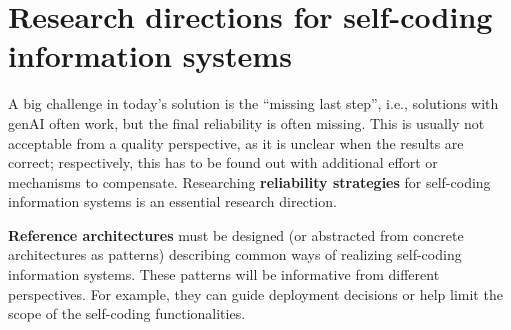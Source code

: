 \documentclass[sigconf]{acmart}
\newcommand{\inlinetodo}[1]{\todo[inline]{#1}}
\theoremstyle{definition}
\begin{document}


\section{Research directions for self-coding information systems}


A big challenge in today's solution is the ``missing last step'', i.e., solutions with genAI often work, but the final reliability is often missing. This is usually not acceptable from a quality perspective, as it is unclear when the results are correct; respectively, this has to be found out with additional effort or mechanisms to compensate. Researching \textbf{reliability strategies} for self-coding information systems is an essential research direction.

\textbf{Reference architectures} must be designed (or abstracted from concrete architectures as patterns) describing common ways of realizing self-coding information systems. These patterns will be informative from different perspectives. For example, they can guide deployment decisions or help limit the scope of the self-coding functionalities.
\end{document}
